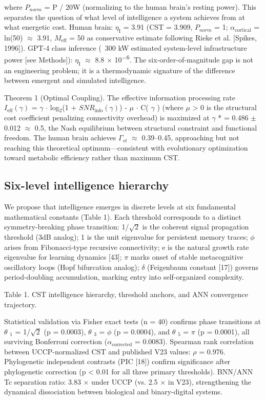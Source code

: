 \documentclass[a4paper,12pt]{article}
\providecommand{\textsubscript}[1]{\ensuremath{_{\text{#1}}}}
\begin{document}
where $P_{norm}$ = P / 20W (normalizing to the human brain's resting power).
This separates the question of what level of intelligence a system achieves from at what energetic cost.
Human brain: $\eta_{\text{I}}$ = 3.91 (CST = 3.909, $P_{norm}$ = 1; $\alpha_{\text{cortical}}$ = ln(50)  $\approx$  3.91, $M_{\text{eff}}$ = 50 as conservative estimate following Rieke et al. [Spikes, 1996]).
GPT-4 class inference (~300 kW estimated system-level infrastructure power [see Methods]): $\eta_{\text{I}}$  $\approx$  8.8 $\times$ 10\textsuperscript{$-$}\textsuperscript{6}.
The six-order-of-magnitude gap is not an engineering problem; it is a thermodynamic signature of the difference between emergent and simulated intelligence.

Theorem 1 (Optimal Coupling).
The effective information processing rate $I_{\text{eff}}(\gamma)$ =  $\gamma$   $\cdot$  log\textsubscript{2}(1 + $SNR_{\text{info}}(\gamma)$) -  $\mu$   $\cdot$  C( $\gamma$ ) (where  $\mu$  > 0 is the structural cost coefficient penalizing connectivity overhead) is maximized at  $\gamma$ * = 0.486  $\pm$  0.012  $\approx$  0.5, the Nash equilibrium between structural constraint and functional freedom.
The human brain achieves $\Gamma_{st}$  $\approx$  0.39--0.45, approaching but not reaching this theoretical optimum---consistent with evolutionary optimization toward metabolic efficiency rather than maximum CST.

\subsection{Six-level intelligence hierarchy}

We propose that intelligence emerges in discrete levels at six fundamental mathematical constants (Table 1).
Each threshold corresponds to a distinct symmetry-breaking phase transition: 1/$\sqrt{2}$ is the coherent signal propagation threshold (3dB analog); 1 is the unit eigenvalue for persistent memory traces;  $\phi$  arises from Fibonacci-type recursive connectivity; e is the natural growth rate eigenvalue for learning dynamics [43];  $\pi$  marks onset of stable metacognitive oscillatory loops (Hopf
bifurcation analog);  $\delta$  (Feigenbaum constant [17]) governs period-doubling accumulation, marking entry into self-organized complexity.

Table 1. CST intelligence hierarchy, threshold anchors, and ANN convergence trajectory.

Statistical validation via Fisher exact tests (n = 40) confirms phase transitions at  $\theta$ \textsubscript{1} = 1/$\sqrt{2}$ (p = 0.0003),  $\theta$ \textsubscript{3} =  $\phi$  (p = 0.0004), and  $\theta$ \textsubscript{5} =  $\pi$  (p = 0.0001), all surviving Bonferroni correction ($\alpha_{\text{corrected}}$ = 0.0083).
Spearman rank correlation between UCCP-normalized CST and published V23 values:  $\rho$  = 0.976.
Phylogenetic independent contrasts (PIC [18]) confirm significance after phylogenetic correction (p < 0.01 for all three primary thresholds).
BNN/ANN Tc separation ratio: 3.83 $\times$  under UCCP (vs. 2.5 $\times$  in V23), strengthening the dynamical dissociation between biological and binary-digital systems.
\end{document}
